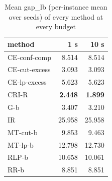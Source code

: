 \begin{table}[htbp]
\centering
\small
\caption{Mean gap\_lb (per-instance mean over seeds) of every method at every budget}
\label{tab:E2b_head_to_head_budgets_gap_by_budget}
\begin{tabular}{lrr}
\toprule
method & 1 s & 10 s \\
\midrule
CE-conf-comp & 8.514 & 8.514 \\
CE-cut-excess & 3.093 & 3.093 \\
CE-lp-excess & 5.623 & 5.623 \\
CRI-R & \textbf{2.448} & \textbf{1.899} \\
G-b & 3.407 & 3.210 \\
IR & 25.958 & 25.958 \\
MT-cut-b & 9.853 & 9.463 \\
MT-lp-b & 12.798 & 12.730 \\
RLP-b & 10.658 & 10.061 \\
RR-b & 8.851 & 8.851 \\
\bottomrule
\end{tabular}
\end{table}
